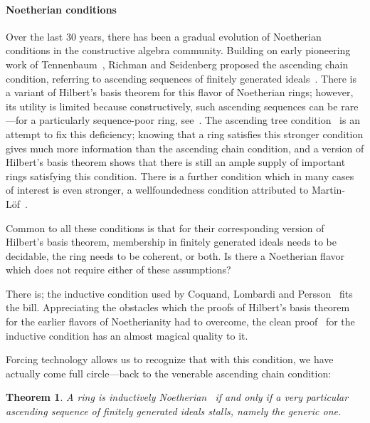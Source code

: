 \documentclass[com,11pt,crcready]{iosart2x}
\theoremstyle{definition}
\theoremstyle{plain}
\newtheorem{theorem}[definition]{Theorem}
\theoremstyle{remark}
\newcommand{\?}{\,{:}\,}
\renewcommand{\_}{\mathpunct{.}\,}
\begin{document}
\paragraph{Noetherian conditions} Over the last 30 years, there has been a
gradual evolution of Noetherian conditions in the constructive algebra
community. Building on early pioneering work of
Tennenbaum~\cite{tennenbaum:hilbert}, Richman and Seidenberg proposed the
ascending chain condition, referring to ascending sequences of finitely
generated ideals~\cite{richman:noetherian-old,seidenberg:noether}. There is a
variant of Hilbert's basis theorem for this flavor of Noetherian rings;
however, its utility is limited because constructively, such ascending
sequences can be rare---for a particularly sequence-poor ring,
see~\cite[Example~2]{blass:induction}.
%
The ascending tree condition~\cite{richman:noetherian} is an attempt to fix
this deficiency; knowing that a ring satisfies this stronger condition gives much more
information than the ascending chain condition, and a version of Hilbert's
basis theorem shows that there is still an ample supply of important rings
satisfying this condition. There is a further condition which in many cases
of interest is even stronger, a wellfoundedness condition attributed to
Martin-Löf~\cite{jacobsson-lofwall:standard}.

Common to all these conditions is that for their corresponding version of
Hilbert's basis theorem, membership in finitely generated ideals needs to be
decidable, the ring needs to be coherent, or both. Is there a Noetherian flavor
which does not require either of these assumptions?

There is; the inductive condition used by Coquand, Lombardi and
Persson~\cite{coquand-persson:groebner,coquand-lombardi:krull} fits the bill.
Appreciating the obstacles which the proofs of Hilbert's basis theorem for the
earlier flavors of Noetherianity had to overcome, the clean proof~\cite[Corollary~16]{coquand-persson:groebner} for the
inductive condition has an almost magical
quality to it.

Forcing technology allows us to recognize that with this condition, we have
actually come full circle---back to the venerable ascending chain condition:

\begin{theorem}A ring is inductively
Noetherian~\cite{coquand-persson:groebner,coquand-lombardi:krull,coquand:invariant} if and only if a very
particular ascending sequence of finitely generated ideals stalls, namely
\emph{the generic one}.
\end{theorem}
\end{document}
